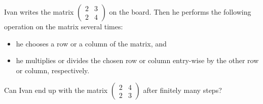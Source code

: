 \documentclass{article}
\begin{document}
\setlength{\parindent}{0pt}
Ivan writes the matrix \(\displaystyle \begin{pmatrix}
	2 & 3 \\
	2 & 4
\end{pmatrix}\) on the board. Then he performs the following operation on the matrix several times: 
\begin{itemize}
\item he chooses a row or a column of the matrix, and
\item he multiplies or divides the chosen row or column entry-wise by the other row or column, respectively.
\end{itemize}
 Can Ivan end up with the matrix \(\displaystyle \begin{pmatrix}
	2 & 4 \\
	2 & 3
\end{pmatrix}\) after finitely many steps?
\end{document}
